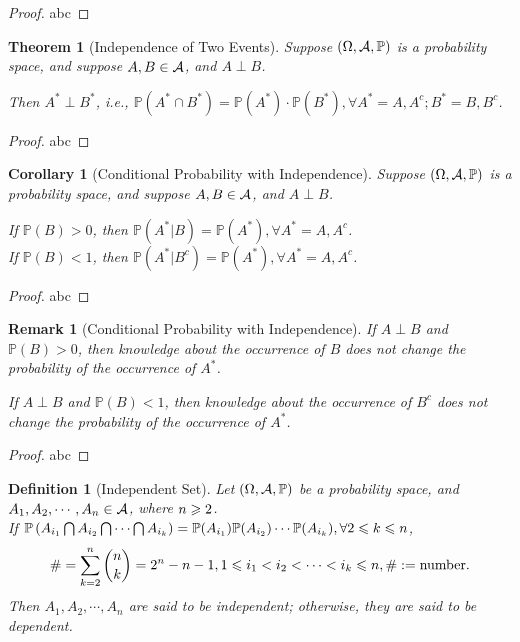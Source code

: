 \documentclass[openany,12pt]{book}
\newtheorem{theorem}{Theorem}[chapter]
\newtheorem{corollary}{Corollary}[chapter]
\newtheorem{remark}{Remark}[chapter]
\newtheorem{definition}{Definition}[chapter]
\begin{document}
\begin{proof}
  abc
\end{proof}

\begin{theorem}[Independence of Two Events]
  Suppose $(\Omega,\mathcal{A},\mathbb{P})$ is a probability space, and suppose $A,B\in\mathcal{A}$, and $A\perp B$.

  Then $A^*\perp B^*$, i.e., $\mathbb{P}(A^*\cap B^*)=\mathbb{P}(A^*)\cdot \mathbb{P}(B^*),\forall  A^*=A, A^c; B^*=B, B^c$.
\end{theorem}

\begin{proof}
  abc
\end{proof}

\begin{corollary}[Conditional Probability with Independence]
  Suppose $(\Omega,\mathcal{A},\mathbb{P})$ is a probability space, and suppose $A,B\in\mathcal{A}$, and $A\perp B$.

  If $\mathbb{P}(B)>0$, then $\mathbb{P}(A^*|B)=\mathbb{P}(A^*),\forall A^*=A, A^c$.\\
  If $\mathbb{P}(B)<1$, then $\mathbb{P}(A^*|B^c)=\mathbb{P}(A^*),\forall A^*=A, A^c$.

\end{corollary}

\begin{proof}
  abc
\end{proof}

\begin{remark}[Conditional Probability with Independence]
  If $A\perp B$ and $\mathbb{P}(B)>0$, then knowledge about the occurrence of $B$ does not change the probability of the occurrence of $A^*$.

  If $A\perp B$ and $\mathbb{P}(B)<1$, then knowledge about the occurrence of $B^c$  does not change the probability of the occurrence of $A^*$.

\end{remark}

\begin{proof}
  abc
\end{proof}

\begin{definition}[Independent Set]
  Let $(\Omega,\mathcal{A},\mathbb{P})$ be a probability space, and $A_1,A_2, \cdots,A_n\in\mathcal{A}$, where $n\geqslant2$.\\
  If $\mathbb{P}\left(A_{i_1}\bigcap A_{i_2}\bigcap\cdots\bigcap A_{i_k}\right)=\mathbb{P}(A_{i_1})\mathbb{P}(A_{i_2})\cdots \mathbb{P}(A_{i_k }),\forall 2\leqslant k\leqslant n$,
  $$ \#=\sum_{k=2}^n \binom n k=2^n-n-1,1\leqslant i_1<i_2<\cdots<i_k\leqslant n,\#:= \text{number}.$$
  Then $A_1,A_2, \cdots,A_{n }$ are said to be independent; otherwise, they are said to be dependent.
\end{definition}
\end{document}
